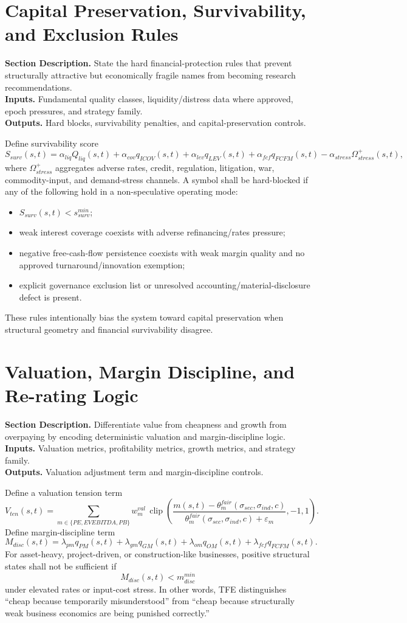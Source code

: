 \documentclass[11pt]{report}
\newcommand{\meta}[3]{\textbf{Section Description.} #1\\
\textbf{Inputs.} #2\\
\textbf{Outputs.} #3\par}
\begin{document}
\section{Capital Preservation, Survivability, and Exclusion Rules}
\meta{State the hard financial-protection rules that prevent structurally attractive but economically fragile names from becoming research recommendations.}{Fundamental quality classes, liquidity/distress data where approved, epoch pressures, and strategy family.}{Hard blocks, survivability penalties, and capital-preservation controls.}

Define survivability score
\[
S_{surv}(s,t)=\alpha_{liq}Q_{liq}(s,t)+\alpha_{cov}q_{ICOV}(s,t)+\alpha_{lev}q_{LEV}(s,t)+\alpha_{fcf}q_{FCFM}(s,t)-\alpha_{stress}\Omega_{stress}^{+}(s,t),
\]
where $\Omega_{stress}^{+}$ aggregates adverse rates, credit, regulation, litigation, war, commodity-input, and demand-stress channels. A symbol shall be hard-blocked if any of the following hold in a non-speculative operating mode:
\begin{itemize}
    \item $S_{surv}(s,t) < s_{surv}^{min}$;
    \item weak interest coverage coexists with adverse refinancing/rates pressure;
    \item negative free-cash-flow persistence coexists with weak margin quality and no approved turnaround/innovation exemption;
    \item explicit governance exclusion list or unresolved accounting/material-disclosure defect is present.
\end{itemize}
These rules intentionally bias the system toward capital preservation when structural geometry and financial survivability disagree.

\section{Valuation, Margin Discipline, and Re-rating Logic}
\meta{Differentiate value from cheapness and growth from overpaying by encoding deterministic valuation and margin-discipline logic.}{Valuation metrics, profitability metrics, growth metrics, and strategy family.}{Valuation adjustment term and margin-discipline controls.}

Define a valuation tension term
\[
V_{ten}(s,t)=\sum_{m\in\{PE,EVEBITDA,PB\}} w_m^{val}\,\operatorname{clip}\!\left(\frac{m(s,t)-\theta_m^{fair}(\sigma_{sec},\sigma_{ind},c)}{\theta_m^{fair}(\sigma_{sec},\sigma_{ind},c)+\varepsilon_m},-1,1\right).
\]
Define margin-discipline term
\[
M_{disc}(s,t)=\lambda_{pm}q_{PM}(s,t)+\lambda_{gm}q_{GM}(s,t)+\lambda_{om}q_{OM}(s,t)+\lambda_{fcf}q_{FCFM}(s,t).
\]
For asset-heavy, project-driven, or construction-like businesses, positive structural states shall not be sufficient if
\[
M_{disc}(s,t)<m_{disc}^{min}
\]
under elevated rates or input-cost stress. In other words, TFE distinguishes ``cheap because temporarily misunderstood'' from ``cheap because structurally weak business economics are being punished correctly.''
\end{document}
